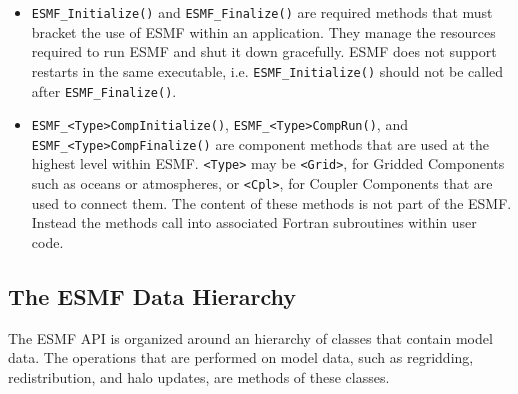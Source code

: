 \begin{itemize}

\item {\tt ESMF\_Initialize()} and {\tt ESMF\_Finalize()} are required 
methods that must bracket the use of ESMF within an application.  
They manage the resources required to run ESMF and shut it down
gracefully.  ESMF does not support restarts in the same executable, i.e.
{\tt ESMF\_Initialize()} should not be called after {\tt ESMF\_Finalize()}.
\item {\tt ESMF\_<Type>CompInitialize()}, {\tt ESMF\_<Type>CompRun()}, and 
{\tt ESMF\_<Type>CompFinalize()} are component methods that are used at the 
highest level within ESMF.  {\tt <Type>} may be {\tt <Grid>}, for 
Gridded Components such as oceans or atmospheres, or
{\tt <Cpl>}, for Coupler Components that are used to connect 
them.  The content of these methods is not part of the ESMF.  
Instead the methods call into associated Fortran subroutines within 
user code.

\end{itemize}

\subsection{The ESMF Data Hierarchy}

The ESMF API is organized around an hierarchy of classes that 
contain model data.  The operations that are performed
on model data, such as regridding, redistribution, and halo 
updates, are methods of these classes.  

